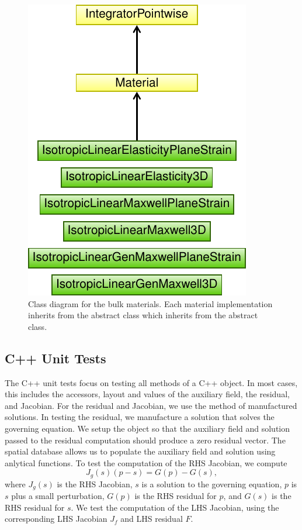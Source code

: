 \begin{figure}[htbp]
  \includegraphics[scale=0.8]{developer/figs/material_classdiagram}
  \caption{Class diagram for the bulk materials. Each material
    implementation inherits from the abstract  class
    which inherits from the abstract 
    class.}
  \label{fig:developer:material:class}
\end{figure}

\subsection{C++ Unit Tests}

The C++ unit tests focus on testing all methods of a C++ object. In
most cases, this includes the accessors, layout and values of the
auxiliary field, the residual, and Jacobian. For the residual and
Jacobian, we use the method of manufactured solutions. In testing the
residual, we manufacture a solution that solves the governing
equation. We setup the object so that the auxiliary field and solution
passed to the residual computation should produce a zero residual
vector. The  spatial database allows us to
populate the auxiliary field and solution using anlytical
functions. To test the computation of the RHS Jacobian, we compute
\begin{equation}
    J_g(s) (p - s) = G(p) - G(s),
\end{equation}
where $J_g(s)$ is the RHS Jacobian, $s$ is a solution to the governing
equation, $p$ is $s$ plus a small perturbation, $G(p)$ is the RHS
residual for $p$, and $G(s)$ is the RHS residual for $s$. We test the
computation of the LHS Jacobian, using the corresponding LHS Jacobian
$J_f$ and LHS residual $F$.

